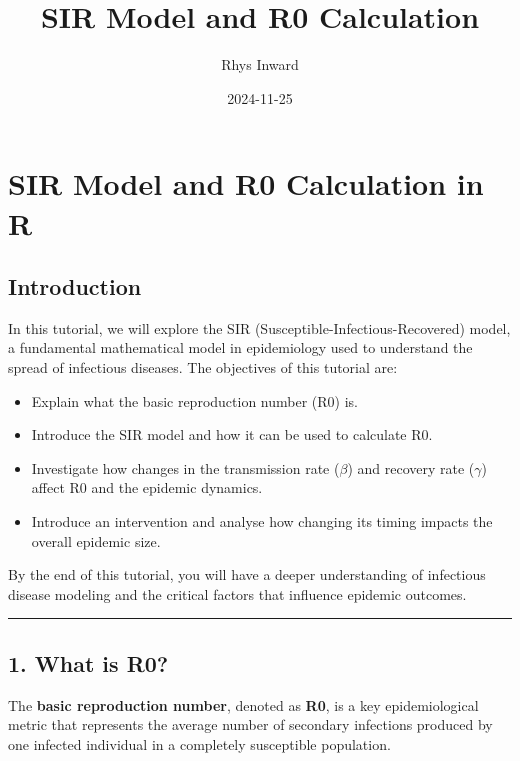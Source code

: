 \documentclass[
]{article}
\title{SIR Model and R0 Calculation}
\author{Rhys Inward}
\date{2024-11-25}
\providecommand{\tightlist}{%
  \setlength{\itemsep}{0pt}\setlength{\parskip}{0pt}}
\begin{document}
\maketitle

\hypertarget{sir-model-and-r0-calculation-in-r}{%
\section{SIR Model and R0 Calculation in
R}\label{sir-model-and-r0-calculation-in-r}}

\hypertarget{introduction}{%
\subsection{Introduction}\label{introduction}}

In this tutorial, we will explore the SIR
(Susceptible-Infectious-Recovered) model, a fundamental mathematical
model in epidemiology used to understand the spread of infectious
diseases. The objectives of this tutorial are:

\begin{itemize}
\tightlist
\item
  Explain what the basic reproduction number (R0) is.
\item
  Introduce the SIR model and how it can be used to calculate R0.
\item
  Investigate how changes in the transmission rate (\(\beta\)) and
  recovery rate (\(\gamma\)) affect R0 and the epidemic dynamics.
\item
  Introduce an intervention and analyse how changing its timing impacts
  the overall epidemic size.
\end{itemize}

By the end of this tutorial, you will have a deeper understanding of
infectious disease modeling and the critical factors that influence
epidemic outcomes.

\begin{center}\rule{0.5\linewidth}{0.5pt}\end{center}

\hypertarget{what-is-r0}{%
\subsection{1. What is R0?}\label{what-is-r0}}

The \textbf{basic reproduction number}, denoted as \textbf{R0}, is a key
epidemiological metric that represents the average number of secondary
infections produced by one infected individual in a completely
susceptible population.
\end{document}
